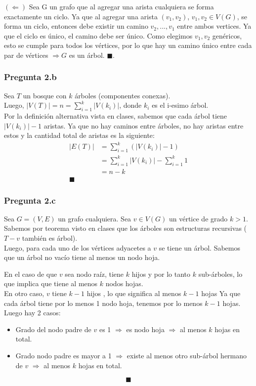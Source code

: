 \documentclass[12pt]{article}
\begin{document}
$(\Leftarrow)$
Sea G un grafo que al agregar una arista cualquiera se forma exactamente un ciclo. Ya que al agregar una arista $(v_1, v_2)$, $v_1, v_2 \in V(G)$, se forma un ciclo, entonces debe existir un camino $v_2, ..., v_1$ entre ambos vertices. Ya que el ciclo es único, el camino debe ser único. Como elegimos $v_1, v_2$ genéricos, esto se cumple para todos los vértices, por lo que hay un camino único entre cada par de vértices $\Rightarrow G$ es un árbol. $\blacksquare$. \\

\subsubsection*{Pregunta 2.b}
Sea $T$ un bosque con $k$ árboles (componentes conexas). \\
Luego, $|V(T)| = n = \displaystyle\sum_{i=1}^{k}{|V(k_i)|}$, donde $k_i$ es el i-esimo árbol. \\
Por la definición alternativa vista en clases, sabemos que cada árbol tiene $|V(k_i)| - 1$ aristas.
Ya que no hay caminos entre árboles, no hay aristas entre estos y la cantidad total de aristas es la siguiente: \\
\begin{align*}
|E(T)| &= \sum_{i=1}^k(|V(k_i)| - 1) \\
&= \sum_{i=1}^{k}{|V(k_i)|} - \sum_{i=1}^{k} 1 \\ 
&= n - k \\
\blacksquare
\end{align*}

\newpage
\subsubsection*{Pregunta 2.c}
Sea $G = (V, E)$ un grafo cualquiera. Sea $v \in V(G)$ un vértice de grado $k > 1$. \\
Sabemos por teorema visto en clases que los árboles son estructuras recursivas ($T - v$ también es árbol). \\
Luego, para cada uno de los vértices adyacetes a $v$ se tiene un árbol. 
Sabemos que un árbol no vacío tiene al menos un nodo hoja.

En el caso de que $v$ sea nodo raíz, tiene $k$ hijos y por lo tanto $k$ sub-árboles, lo que implica que tiene al menos $k$ nodos hojas.\\
En otro caso, $v$ tiene $k - 1$ hijos , lo que significa al menos $k - 1$ hojas
Ya que cada árbol tiene por lo menos 1 nodo hoja, tenemos por lo menos $k - 1$ hojas. Luego hay 2 casos:
\begin{itemize}
  \item Grado del nodo padre de $v$ es 1 $\Rightarrow$ es nodo hoja $\Rightarrow$ al menos $k$ hojas en total.
  \item Grado nodo padre es mayor a 1 $\Rightarrow$ existe al menos otro sub-árbol hermano de $v$ $\Rightarrow$ al menos $k$ hojas en total.
\end{itemize}
$$\blacksquare$$
\end{document}
